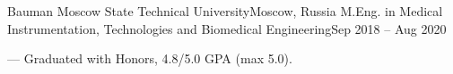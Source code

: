 \resumeSubheading
{Bauman Moscow State Technical University}{Moscow, Russia}
{M.Eng. in Medical Instrumentation, Technologies and Biomedical Engineering}{Sep 2018 -- Aug 2020}
\begin{itemize}[leftmargin=0in, label={}]
    \small{\item{
        {— Graduated with Honors, 4.8/5.0 GPA (max 5.0).}\\
    }}
    \end{itemize}
